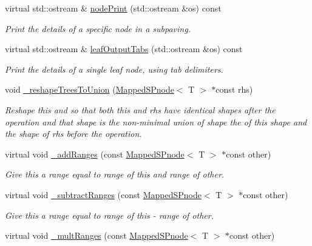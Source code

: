 \begin{DoxyCompactItemize}
virtual std\-::ostream \& \hyperlink{classsubpavings_1_1MappedSPnode_a798b65086b8c8042522fc317e73247a7}{node\-Print} (std\-::ostream \&os) const 
\begin{DoxyCompactList}\small\item\em \-Print the details of a specific node in a subpaving. \end{DoxyCompactList}\item 
virtual std\-::ostream \& \hyperlink{classsubpavings_1_1MappedSPnode_aa35a5e2e8518004e8feefb3bdea98d53}{leaf\-Output\-Tabs} (std\-::ostream \&os) const 
\begin{DoxyCompactList}\small\item\em \-Print the details of a single leaf node, using tab delimiters. \end{DoxyCompactList}\item 
void \hyperlink{classsubpavings_1_1MappedSPnode_a8c3d82f771a9c88493bffc96dd1341ce}{\-\_\-reshape\-Trees\-To\-Union} (\hyperlink{classsubpavings_1_1MappedSPnode}{\-Mapped\-S\-Pnode}$<$ \-T $>$ $\ast$const rhs)
\begin{DoxyCompactList}\small\item\em \-Reshape this and  so that both this and rhs have identical shapes after the operation and that shape is the non-\/minimal union of shape the of this shape and the shape of rhs before the operation. \end{DoxyCompactList}\item 
virtual void \hyperlink{classsubpavings_1_1MappedSPnode_a5fc2d7092ac40f04bd0f83f4ee110fdc}{\-\_\-add\-Ranges} (const \hyperlink{classsubpavings_1_1MappedSPnode}{\-Mapped\-S\-Pnode}$<$ \-T $>$ $\ast$const other)
\begin{DoxyCompactList}\small\item\em \-Give this a range equal to range of this and range of other. \end{DoxyCompactList}\item 
virtual void \hyperlink{classsubpavings_1_1MappedSPnode_a78e906fbd5153a29f4de538ccbdc1383}{\-\_\-subtract\-Ranges} (const \hyperlink{classsubpavings_1_1MappedSPnode}{\-Mapped\-S\-Pnode}$<$ \-T $>$ $\ast$const other)
\begin{DoxyCompactList}\small\item\em \-Give this a range equal to range of this -\/ range of other. \end{DoxyCompactList}\item 
virtual void \hyperlink{classsubpavings_1_1MappedSPnode_aa9df7035975f4d82aa605e6ac2a1ffe3}{\-\_\-mult\-Ranges} (const \hyperlink{classsubpavings_1_1MappedSPnode}{\-Mapped\-S\-Pnode}$<$ \-T $>$ $\ast$const other)

\end{DoxyCompactItemize}
